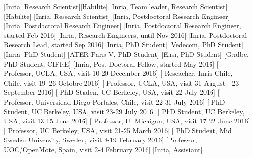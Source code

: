 \documentclass{ra2016}
\begin{document}
\begin{composition}
    [Inria, Research Scientist][Habilite]
    [Inria, Team leader, Research Scientist][Habilite]
    [Inria, Research Scientist]
    [Inria, Postdoctoral Research Engineer]
    [Inria, Postdoctoral Research Engineer]
    [Inria, Postdoctoral Research Engineer, started Feb 2016]
    [Inria, Research Engineers, until Nov 2016]
    [Inria, Postdoctoral Research Lead, started Sep 2016]
    [Inria, PhD Student]
    [Vedecom, PhD Student]
    [Inria, PhD Student]
    [ATER Paris V, PhD Student]
    [Ensi, PhD Student]
    [Gridbe, PhD Student, CIFRE]
    [Inria, Post-Doctoral Fellow, started May 2016]
    [    Professor,   UCLA,                       USA,    visit 10-20 December 2016]
    [ Reseacher,   Inria Chile,                Chile,  visit 19–26 Octobre 2016]
    [    Professor,   UCLA,                       USA,    visit 31 August - 23 September 2016]
    [  PhD Studen,  UC Berkeley,                USA,    visit 22 July 2016]
    [  Professor,   Universidad Diego Portales, Chile,  visit 22-31 July 2016]
    [   PhD Student, UC Berkeley,                USA,    visit 23-29 July 2016]
    [  PhD Student, UC Berkeley,                USA,    visit 13-15 June 2016]
    [  Professor,   U. Michigan,                USA,    visit 17-22 June 2016]
    [  Professor,   UC Berkeley,                USA,    visit 21-25 March 2016]
    [    PhD Student, Mid Sweden University,      Sweden, visit 8-19 February 2016]
    [Professor,   UOC/OpenMote,               Spain,  visit 2-4 February 2016]
    [Inria, Assistant]

\end{composition}
\end{document}
